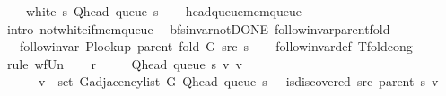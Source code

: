 \begin{isabellebody}
\ \ \ {\isachardoublequoteopen}{\isasymnot}\ white\ s\ {\isacharparenleft}{\kern0pt}Q{\isacharunderscore}{\kern0pt}head\ {\isacharparenleft}{\kern0pt}queue\ s{\isacharparenright}{\kern0pt}{\isacharparenright}{\kern0pt}{\isachardoublequoteclose}\isanewline
%
\isadelimproof
\ \ %
\endisadelimproof
%
\isatagproof
{}\isamarkupfalse%
\ head{\isacharunderscore}{\kern0pt}queue{\isacharunderscore}{\kern0pt}mem{\isacharunderscore}{\kern0pt}queue\isanewline
\ \ \isamarkupfalse%
\ {\isacharparenleft}{\kern0pt}intro\ not{\isacharunderscore}{\kern0pt}white{\isacharunderscore}{\kern0pt}if{\isacharunderscore}{\kern0pt}mem{\isacharunderscore}{\kern0pt}queue{\isacharparenright}{\kern0pt}%
\endisatagproof
{\isafoldproof}%
%
\isadelimproof
\isanewline
%
\endisadelimproof
\isanewline
{}\isamarkupfalse%
\ {\isacharparenleft}{\kern0pt}\ bfs{\isacharunderscore}{\kern0pt}invar{\isacharunderscore}{\kern0pt}not{\isacharunderscore}{\kern0pt}DONE{\isacharparenright}{\kern0pt}\ follow{\isacharunderscore}{\kern0pt}invar{\isacharunderscore}{\kern0pt}parent{\isacharunderscore}{\kern0pt}fold{\isacharcolon}{\kern0pt}\isanewline
\ \ \ {\isachardoublequoteopen}follow{\isacharunderscore}{\kern0pt}invar\ {\isacharparenleft}{\kern0pt}P{\isacharunderscore}{\kern0pt}lookup\ {\isacharparenleft}{\kern0pt}parent\ {\isacharparenleft}{\kern0pt}fold\ G\ src\ s{\isacharparenright}{\kern0pt}{\isacharparenright}{\kern0pt}{\isacharparenright}{\kern0pt}{\isachardoublequoteclose}\isanewline
%
\isadelimproof
\ \ %
\endisadelimproof
%
\isatagproof
{}\isamarkupfalse%
\ follow{\isacharunderscore}{\kern0pt}invar{\isacharunderscore}{\kern0pt}def\ T{\isacharunderscore}{\kern0pt}fold{\isacharunderscore}{\kern0pt}cong\isanewline
{}\isamarkupfalse%
\ {\isacharparenleft}{\kern0pt}rule\ wf{\isacharunderscore}{\kern0pt}Un{\isacharparenright}{\kern0pt}\isanewline
\ \ \isamarkupfalse%
\ {\isacharquery}{\kern0pt}r\ {\isacharequal}{\kern0pt}\isanewline
\ \ \ \ {\isachardoublequoteopen}{\isacharbraceleft}{\kern0pt}{\isacharparenleft}{\kern0pt}Q{\isacharunderscore}{\kern0pt}head\ {\isacharparenleft}{\kern0pt}queue\ s{\isacharparenright}{\kern0pt}{\isacharcomma}{\kern0pt}\ v{\isacharparenright}{\kern0pt}\ {\isacharbar}{\kern0pt}v{\isachardot}{\kern0pt}\isanewline
\ \ \ \ \ \ v\ {\isasymin}\ set\ {\isacharparenleft}{\kern0pt}G{\isachardot}{\kern0pt}adjacency{\isacharunderscore}{\kern0pt}list\ G\ {\isacharparenleft}{\kern0pt}Q{\isacharunderscore}{\kern0pt}head\ {\isacharparenleft}{\kern0pt}queue\ s{\isacharparenright}{\kern0pt}{\isacharparenright}{\kern0pt}{\isacharparenright}{\kern0pt}\ {\isasymand}\ {\isasymnot}\ is{\isacharunderscore}{\kern0pt}discovered\ src\ {\isacharparenleft}{\kern0pt}parent\ s{\isacharparenright}{\kern0pt}\ v{\isacharbraceright}{\kern0pt}{\isachardoublequoteclose}\isanewline

\end{isabellebody}
